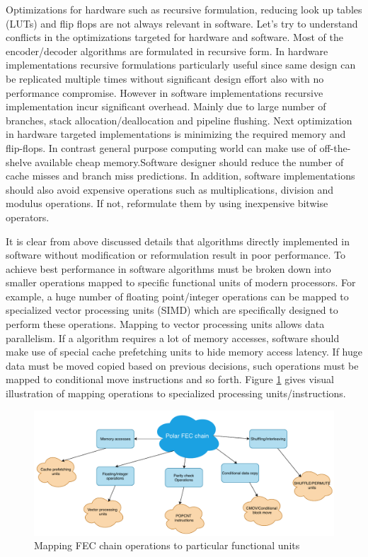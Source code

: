 Optimizations for hardware such as recursive formulation, reducing look up tables (LUTs) and flip flops are not always relevant in software. Let's try to understand conflicts in the optimizations targeted for hardware and software. Most of the encoder/decoder algorithms are formulated in recursive form. In hardware implementations recursive formulations particularly useful since same design can be replicated multiple times without significant design effort also with no performance compromise. However in software implementations recursive implementation incur significant overhead. Mainly due to large number of branches, stack allocation/deallocation and pipeline flushing. Next optimization in hardware targeted implementations is minimizing the required memory and flip-flops. In contrast general purpose computing world can make use of off-the-shelve available cheap memory.Software designer should reduce the number of cache misses and branch miss predictions. In addition, software implementations should also avoid expensive operations such as multiplications, division and modulus operations. If not, reformulate them by using inexpensive bitwise operators. \newline

It is clear from above discussed details that algorithms directly implemented in software without modification or reformulation result in poor performance. To achieve best performance in software algorithms must be broken down into smaller operations mapped to specific functional units of modern processors. For example, a huge number of floating point/integer operations can be mapped to specialized vector processing units (SIMD) which are specifically designed to perform these operations. Mapping to vector processing units allows data parallelism. If a algorithm requires a lot of memory accesses, software should make use of special cache prefetching units to hide memory access latency. If huge data must be moved copied based on previous decisions, such operations must be mapped to conditional move instructions and so forth.  Figure \ref{fig:operationMapping} gives visual illustration of mapping operations to specialized processing units/instructions.

\begin{figure}[]
	\centering
	\includegraphics[width=1\textwidth]{./figures/operationMapping.pdf}
	\caption{Mapping FEC chain operations to particular functional units}
	\label{fig:operationMapping}
\end{figure}

